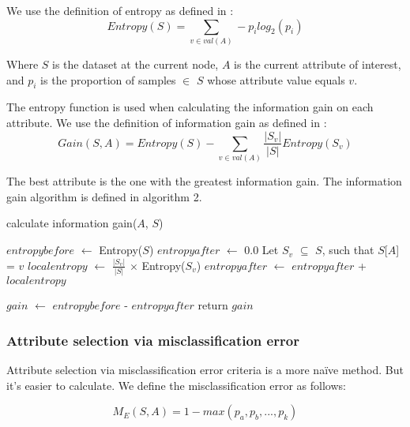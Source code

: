 \documentclass{IEEEtran}
\begin{document}
We use the definition of entropy as defined
in \parencite{mitchell1997machine}:
\begin{equation}
\label{entropy-equation}
Entropy(S) = \sum_{v\in val(A)}-p_ilog_2(p_i)
\end{equation}

Where $S$ is the dataset at the current node, $A$ is the current
attribute of interest, and $p_i$ is the proportion of samples $\in$ $S$
whose attribute value equals $v$.

The entropy function is used when calculating the information gain on
each attribute. We use the definition of information gain as defined
in \parencite{mitchell1997machine}:
\begin{equation}
\label{information-gain-equation}
Gain(S,A) = Entropy(S) -\sum_{v \in val(A)}\frac{|S_v|}{|S|}Entropy(S_v)
\end{equation}

The best attribute is the one with the greatest information gain. The
information gain algorithm is defined in algorithm 2.

\begin{algorithm}
\caption{calculate information gain($A$, $S$)}
\begin{algorithmic}
\Statex{}
\State $entropybefore$ $\leftarrow$ Entropy($S$)
\State $entropyafter$ $\leftarrow$ 0.0
  \State Let $S_v$ $\subseteq$ $S$, such that $S$[$A$] = $v$
  \State $localentropy$ $\leftarrow$ $\frac{|S_v|}{|S|}$ $\times$ Entropy($S_v$)
  \State $entropyafter$ $\leftarrow$ $entropyafter$ + $localentropy$
\EndFor

\State $gain$ $\leftarrow$ $entropybefore$ - $entropyafter$
\State return $gain$
\end{algorithmic}
\end{algorithm}


\subsubsection{Attribute selection via misclassification error}
Attribute selection via misclassification error criteria is a more
na{\"i}ve method. But it's easier to calculate. We define the
misclassification error as follows:

\begin{equation}
\label{misclassification-error-equation}
M_E(S,A) = 1 - max(p_a, p_b, ..., p_k) 
\end{equation}
\end{document}
